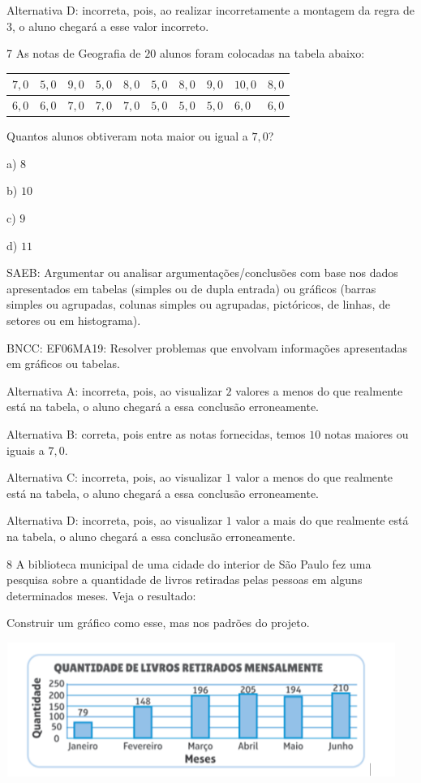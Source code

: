 Alternativa D: incorreta, pois, ao realizar incorretamente a montagem da
regra de $3$, o aluno chegará a esse valor incorreto.

\num{7}  As notas de Geografia de $20$ alunos foram colocadas na tabela abaixo:


\begin{longtable}[]{@{}llllllllll@{}}
\toprule
$7,0$ & $5,0$ & $9,0$ & $5,0$ & $8,0$ & $5,0$ & $8,0$ & $9,0$ & $10,0$ &
$8,0$\tabularnewline
\midrule
\endhead
$6,0$ & $6,0$ & $7,0$ & $7,0$ & $7,0$ & $5,0$ & $5,0$ & $5,0$ & $6,0$ & $6,0$\tabularnewline
\bottomrule
\end{longtable}

Quantos alunos obtiveram nota maior ou igual a $7,0$?

a) $8$

b) $10$

c) $9$

d) $11$

SAEB: Argumentar ou analisar argumentações/conclusões com base nos dados
apresentados em tabelas (simples ou de dupla entrada) ou gráficos
(barras simples ou agrupadas, colunas simples ou agrupadas, pictóricos,
de linhas, de setores ou em histograma).

BNCC: EF06MA19: Resolver problemas que envolvam informações apresentadas
em gráficos ou tabelas.~

Alternativa A: incorreta, pois, ao visualizar $2$ valores a menos do que
realmente está na tabela, o aluno chegará a essa conclusão erroneamente.

Alternativa B: correta, pois entre as notas fornecidas, temos $10$ notas
maiores ou iguais a $7,0$.

Alternativa C: incorreta, pois, ao visualizar $1$ valor a menos do que
realmente está na tabela, o aluno chegará a essa conclusão erroneamente.

Alternativa D: incorreta, pois, ao visualizar $1$ valor a mais do que
realmente está na tabela, o aluno chegará a essa conclusão erroneamente.

\num{8}  A biblioteca municipal de uma cidade do interior de São Paulo fez uma
pesquisa sobre a quantidade de livros retiradas pelas pessoas em alguns
determinados meses. Veja o resultado:

Construir um gráfico como esse, mas nos padrões do projeto.

\includegraphics[width=5in,height=1.71875in]{./imgSAEB_6_MAT/media/image117.png}

